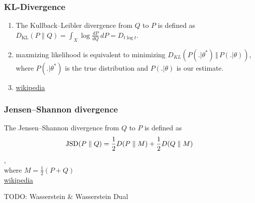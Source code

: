 \subsubsection{KL-Divergence}
\begin{enumerate}
	\item The Kullback–Leibler divergence from $Q$ to $P$ is defined as\\
	$D_{\mathrm {KL} }(P\|Q)=\int _{X}\log {\frac {dP}{dQ}}\,dP=D_{t\log t}$.
	\item maxmizing likelihood is equivalent to minimizing $D_{KL}(P(. \vert \theta^{\ast}) \, \Vert \, P(. \vert \theta))$, where $P(. \vert \theta^{\ast})$ is the true distribution and $P(. \vert \theta)$ is our estimate.
	\item \href{https://en.wikipedia.org/wiki/Kullback–Leibler_divergence}{wikipedia}
\end{enumerate}

\subsubsection{Jensen–Shannon divergence}
The Jensen–Shannon divergence from $Q$ to $P$ is defined as
\begin{align*}
	{{\rm {JSD}}}(P\parallel Q)={\frac  {1}{2}}D(P\parallel M)+{\frac  {1}{2}}D(Q\parallel M)
\end{align*},\\
 where $M={\frac  {1}{2}}(P+Q)$\\
\href{https://en.wikipedia.org/wiki/Jensen–Shannon_divergence}{wikipedia}

TODO: Wasserstein \& Wasserstein Dual